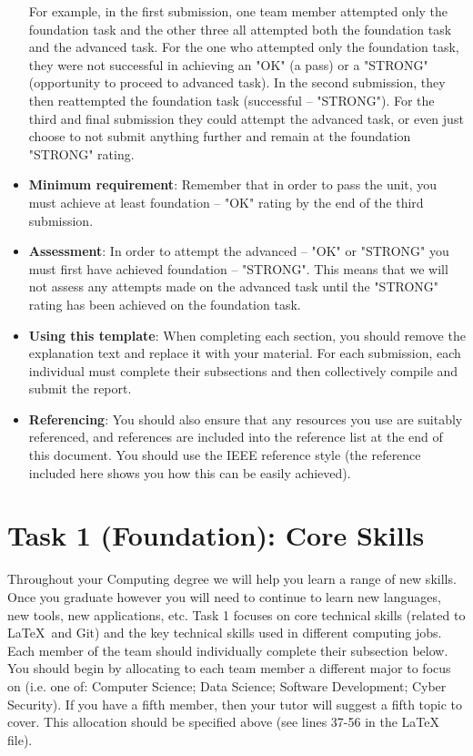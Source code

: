 \documentclass[a4paper, 11pt]{report}
\begin{document}
\begin{itemize}
	For example, in the first submission, one team member attempted only the foundation task and the other three all attempted both the foundation task and the advanced task. For the one who attempted only the foundation task, they were not successful in achieving an "OK" (a pass) or a "STRONG" (opportunity to proceed to advanced task). In the second submission, they then reattempted the foundation task (successful – "STRONG"). For the third and final submission they could attempt the advanced task, or even just choose to not submit anything further and remain at the foundation "STRONG" rating.
	\item \textbf{Minimum requirement}: Remember that in order to pass the unit, you must achieve at least foundation – "OK" rating by the end of the third submission.
	\item \textbf{Assessment}: In order to attempt the advanced – "OK" or "STRONG" you must first have achieved foundation – "STRONG". This means that we will not assess any attempts made on the advanced task until the "STRONG" rating has been achieved on the foundation task. 
	\item \textbf{Using this template}: When completing each section, you should remove the explanation text and replace it with your material. For each submission, each individual must complete their subsections and then collectively compile and submit the report.
	\item \textbf{Referencing}: You should also ensure that any resources you use are suitably referenced, and references are included into the reference list at the end of this document. You should use the IEEE reference style \cite{usyd2} (the reference included here shows you how this can be easily achieved).
\end{itemize}



\newpage
\section{Task 1 (Foundation): Core Skills}

Throughout your Computing degree we will help you learn a range of new skills. Once you graduate however you will need to continue to learn new languages, new tools, new applications, etc. Task 1 focuses on core technical skills (related to \LaTeX\ and Git) and the key technical skills used in different computing jobs. Each member of the team should individually complete their subsection below. You should begin by allocating to each team member a different major to focus on (i.e. one of: Computer Science; Data Science; Software Development; Cyber Security). If you have a fifth member, then your tutor will suggest a fifth topic to cover. This allocation should be specified above (see lines 37-56 in the LaTeX file).
\end{document}
